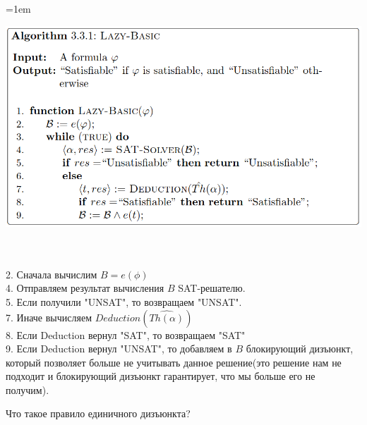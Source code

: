 \documentclass[12pt]{extreport}
\theoremstyle{definiton}
\theoremstyle{definition}
\theoremstyle{definition}
\newenvironment{blockquote}{%
  \par%
  \medskip
  \leftskip=1em%
  \noindent}{%
  \par\medskip}
\begin{document}
\begin{blockquote}
{\begin{center}
  \includegraphics[width=15.5cm]{images/LazyAlgorithm.png}  
\end{center}
\\
\\
2. Сначала вычислим $B = e(\phi)$ \\
4. Отправляем результат вычисления $B$ SAT-решателю.\\
5. Если получили "UNSAT", то возвращаем "UNSAT".\\
7. Иначе вычисляем $Deduction(\hat{Th(\alpha)})$ \\
8. Если Deduction вернул "SAT", то возвращаем "SAT" \\
9. Если Deduction вернул "UNSAT", то добавляем в $B$ блокирующий дизъюнкт, который позволяет больше не учитывать данное решение(это решение нам не подходит и блокирующий дизъюнкт гарантирует, что мы больше его не получим).\\

}
\end{blockquote}

\Pr[\textcolor{mygreen}{Каринэ, DONE}] Что такое правило единичного дизъюнкта?
			
\end{document}
